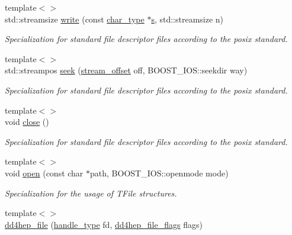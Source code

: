 \begin{DoxyCompactItemize}
{\footnotesize template$<$$>$ }\\std\+::streamsize \hyperlink{class_d_d4hep_1_1dd4hep__file_aaa76e0a0640001e28c8a46716f2332fd}{write} (const \hyperlink{class_d_d4hep_1_1dd4hep__file_aef4242f7f2fe15a59f7bf7a8f6ba24d5}{char\+\_\+type} $\ast$\hyperlink{_volumes_8cpp_a17ca6bfc8040d695d3cada22a4763d40}{s}, std\+::streamsize n)
\begin{DoxyCompactList}\small\item\em Specialization for standard file descriptor files according to the posix standard. \end{DoxyCompactList}\item 
{\footnotesize template$<$$>$ }\\std\+::streampos \hyperlink{class_d_d4hep_1_1dd4hep__file_a13e0c4c08c5b6c0968df3d254853933e}{seek} (\hyperlink{class_d_d4hep_1_1dd4hep__file_a28e1531542193871075e8b7f47818113}{stream\+\_\+offset} off, B\+O\+O\+S\+T\+\_\+\+I\+O\+S\+::seekdir way)
\begin{DoxyCompactList}\small\item\em Specialization for standard file descriptor files according to the posix standard. \end{DoxyCompactList}\item 
{\footnotesize template$<$$>$ }\\void \hyperlink{class_d_d4hep_1_1dd4hep__file_ae2852ad5cdd51d7b2a114d0634dad993}{close} ()
\begin{DoxyCompactList}\small\item\em Specialization for standard file descriptor files according to the posix standard. \end{DoxyCompactList}\item 
{\footnotesize template$<$$>$ }\\void \hyperlink{class_d_d4hep_1_1dd4hep__file_aa578d0326b3a566f21afcada83a3a1d6}{open} (const char $\ast$path, B\+O\+O\+S\+T\+\_\+\+I\+O\+S\+::openmode mode)
\begin{DoxyCompactList}\small\item\em Specialization for the usage of T\+File structures. \end{DoxyCompactList}\item 
{\footnotesize template$<$$>$ }\\\hyperlink{class_d_d4hep_1_1dd4hep__file_a3039b0b69b93de966457883bd6893026}{dd4hep\+\_\+file} (\hyperlink{class_d_d4hep_1_1dd4hep__file_a4d79f8d433cd7831ff818691424cd6fc}{handle\+\_\+type} fd, \hyperlink{namespace_d_d4hep_a31d19f9b0ce567067d2897fbda1761e5}{dd4hep\+\_\+file\+\_\+flags} flags)

\end{DoxyCompactItemize}
